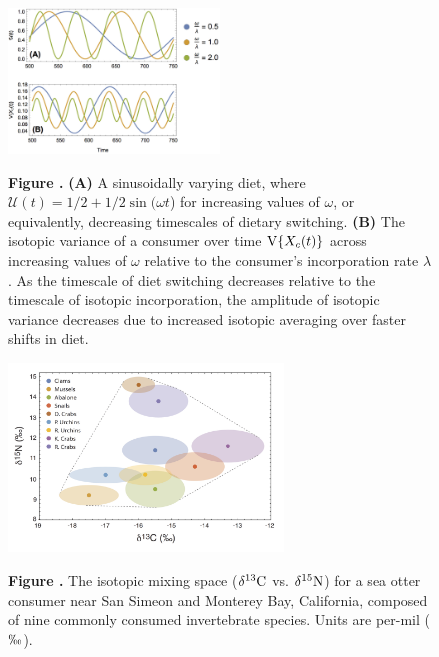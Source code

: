 \documentclass{article}
\begin{document}
\begin{figure}[h!]
\begin{center}
\includegraphics[width=0.5\textwidth]{fig_xcsin.jpg}
\end{center}
\textbf{\label{figxcsin} Figure .}{
{\bf(A)} A sinusoidally varying diet, where $\mathcal{U}(t) = 1/2 + 1/2\sin(\omega t$) for increasing values of $\omega$, or equivalently, decreasing timescales of dietary switching.
{\bf(B)} The isotopic variance of a consumer over time ${\rm V}\{X_c(t)\}$ across increasing values of $\omega$ relative to the consumer's incorporation rate $\lambda$.
As the timescale of diet switching decreases relative to the timescale of isotopic incorporation, the amplitude of isotopic variance decreases due to increased isotopic averaging over faster shifts in diet.
}
\end{figure}

\begin{figure}[h!]
\begin{center}
\includegraphics[width=0.65\textwidth]{fig_SOmixing.jpg}
\end{center}
\textbf{\label{figsomix} Figure .}{
The isotopic mixing space ($\delta^{13}{\rm C}$ vs. $\delta^{15}{\rm N}$) for a sea otter consumer near San Simeon and Monterey Bay, California, composed of nine commonly consumed invertebrate species. Units are per-mil ($\permil$).
}
\end{figure}
\end{document}
